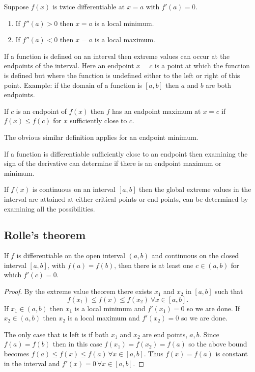 \documentclass[10pt, a4paper]{article}
\begin{document}
Suppose $f(x)$ is twice differentiable at $x = a$ with $f'(a) = 0$.
\begin{enumerate}[label = (\roman*)]
    \item If $f''(a) > 0$ then $x = a$ is a local minimum.
    \item If $f''(a) < 0$ then $x = a$ is a local maximum.
\end{enumerate}

If a function is defined on an interval then extreme values can occur at the endpoints of the interval. Here an endpoint $x = c$ is a point at which the function is defined but where the function is undefined either to the left or right of this point. Example: if the domain of a function is $[a, b]$ then $a$ and $b$ are both endpoints.

\begin{definition}
    If $c$ is an endpoint of $f(x)$ then $f$ has an endpoint maximum at $x = c$ if $f(x) \leq f(c)$ for $x$ sufficiently close to $c$.
\end{definition}

The obvious similar definition applies for an endpoint minimum.

If a function is differentiable sufficiently close to an endpoint then examining the sign of the derivative can determine if there is an endpoint maximum or minimum.

If $f(x)$ is continuous on an interval $[a, b]$ then the global extreme values in the interval are attained at either critical points or end points, can be determined by examining all the possibilities.

\subsection{Rolle's theorem}
\begin{theorem}\label{pre_calc_thm_rolle}
    If $f$ is differentiable on the open interval $(a, b)$ and continuous on the closed interval $[a, b]$, with $f(a) = f(b)$,
    then there is at least one $c \in (a, b)$ for which $f'(c) = 0$.
    \begin{proof}
        By the extreme value theorem there exists $x_1$ and $x_2$ in $[a, b]$ such that
        \[
        f(x_1) \leq f(x) \leq f(x_2)\ \forall x \in [a, b].
        \]
        If $x_1 \in (a, b)$ then $x_1$ is a local minimum and $f'(x_1) = 0$ so we are done.
        If $x_2 \in (a, b)$ then $x_2$ is a local maximum and $f'(x_2) = 0$ so we are done.
    
        The only case that is left is if both $x_1$ and $x_2$ are end points, $a, b$.
        Since $f(a) = f(b)$ then in this case $f(x_1) = f(x_2) = f(a)$ so the above bound becomes $f(a) \leq f(x) \leq f(a)\, \forall x \in [a, b]$.
        Thus $f(x) = f(a)$ is constant in the interval and $f'(x) = 0\, \forall x \in [a, b]$.
    \end{proof}
\end{theorem}
\end{document}
